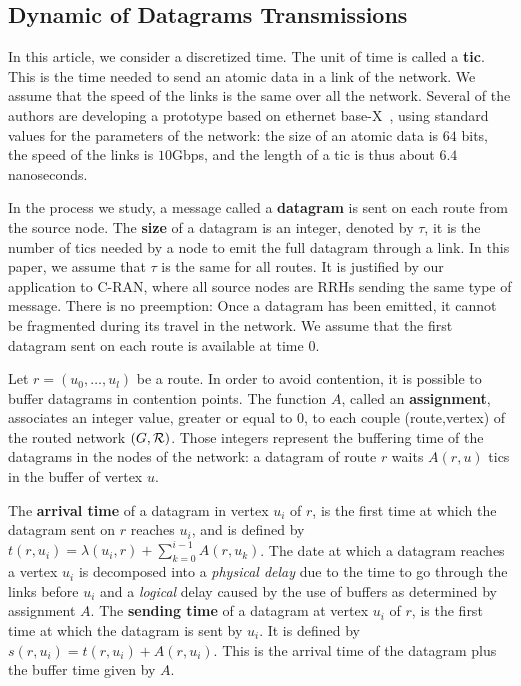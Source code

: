 \documentclass[english]{article}
\begin{document}
 \subsection{Dynamic of Datagrams Transmissions}
	    
 		In this article, we consider a discretized time. The unit of time is called a {\bf tic}. This is the time needed to send an atomic data in a link of the network. We assume that the speed of the links is the same over all the network. Several of the authors are developing a prototype based on ethernet base-X~\cite{ieee_8023}, using standard values for the parameters of the network: the size of an atomic data is $64$ bits, the speed of the links is $10$Gbps, and the length of a tic is thus about $6.4$ nanoseconds. 

        In the process we study, a message called a {\bf datagram} is sent on each route from the source node. The \textbf{size} of a datagram is an integer, denoted by $\tau$, it is the number of tics needed by a node to emit the full datagram through a link.  In this paper, we assume that $\tau$ is the same for all routes. It is justified by our application to C-RAN, where all source nodes are RRHs sending the same type of message. There is no preemption: Once a datagram has been emitted, it cannot be fragmented during its travel in the network. We assume that the first datagram sent on each route is available at time $0$.

          Let $r=(u_0,\dots,u_l)$ be a route. In order to avoid contention, it is possible to buffer datagrams in contention points. The function $A$, called an \textbf{assignment}, associates an integer value, greater or equal to $0$, to each couple (route,vertex) of the routed network $(G,{\cal R})$. Those integers represent the buffering time of the datagrams in the nodes of the network: a datagram of route $r$ waits $A(r,u)$ tics in the buffer of vertex $u$.
          
       

 The \textbf{arrival time} of a datagram in vertex $u_i$ of $r$, is the first time at which the datagram sent on $r$ reaches $u_i$, and is defined by $t(r,u_i) = \lambda(u_i,r) + \sum_{k=0}^{i-1} A(r,u_k) $. The date at which a datagram reaches a vertex $u_i$ is decomposed into a \emph{physical delay} due to the time to go through the links before $u_i$ and a \emph{logical} delay caused by the use of buffers as determined by assignment $A$.
  The \textbf{sending time} of a datagram at vertex $u_i$ of $r$, is the first time at which the datagram is sent by $u_i$. It is defined by $s(r,u_i) = t(r,u_i) +  A(r,u_i) $. This is the arrival time of the datagram plus the buffer time given by $A$.
 
\end{document}
